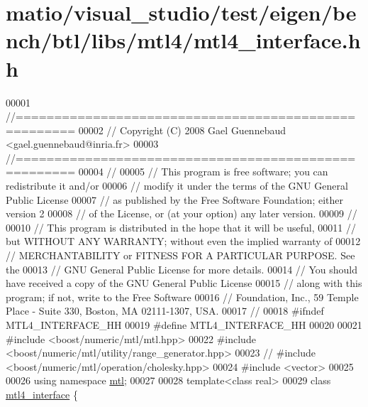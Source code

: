 \hypertarget{matio_2visual__studio_2test_2eigen_2bench_2btl_2libs_2mtl4_2mtl4__interface_8hh_source}{}\section{matio/visual\+\_\+studio/test/eigen/bench/btl/libs/mtl4/mtl4\+\_\+interface.hh}
\label{matio_2visual__studio_2test_2eigen_2bench_2btl_2libs_2mtl4_2mtl4__interface_8hh_source}

\begin{DoxyCode}
00001 \textcolor{comment}{//=====================================================}
00002 \textcolor{comment}{// Copyright (C) 2008 Gael Guennebaud <gael.guennebaud@inria.fr>}
00003 \textcolor{comment}{//=====================================================}
00004 \textcolor{comment}{//}
00005 \textcolor{comment}{// This program is free software; you can redistribute it and/or}
00006 \textcolor{comment}{// modify it under the terms of the GNU General Public License}
00007 \textcolor{comment}{// as published by the Free Software Foundation; either version 2}
00008 \textcolor{comment}{// of the License, or (at your option) any later version.}
00009 \textcolor{comment}{//}
00010 \textcolor{comment}{// This program is distributed in the hope that it will be useful,}
00011 \textcolor{comment}{// but WITHOUT ANY WARRANTY; without even the implied warranty of}
00012 \textcolor{comment}{// MERCHANTABILITY or FITNESS FOR A PARTICULAR PURPOSE.  See the}
00013 \textcolor{comment}{// GNU General Public License for more details.}
00014 \textcolor{comment}{// You should have received a copy of the GNU General Public License}
00015 \textcolor{comment}{// along with this program; if not, write to the Free Software}
00016 \textcolor{comment}{// Foundation, Inc., 59 Temple Place - Suite 330, Boston, MA  02111-1307, USA.}
00017 \textcolor{comment}{//}
00018 \textcolor{preprocessor}{#ifndef MTL4\_INTERFACE\_HH}
00019 \textcolor{preprocessor}{#define MTL4\_INTERFACE\_HH}
00020 
00021 \textcolor{preprocessor}{#include <boost/numeric/mtl/mtl.hpp>}
00022 \textcolor{preprocessor}{#include <boost/numeric/mtl/utility/range\_generator.hpp>}
00023 \textcolor{comment}{// #include <boost/numeric/mtl/operation/cholesky.hpp>}
00024 \textcolor{preprocessor}{#include <vector>}
00025 
00026 \textcolor{keyword}{using namespace }\hyperlink{namespacemtl}{mtl};
00027 
00028 \textcolor{keyword}{template}<\textcolor{keyword}{class} real>
00029 \textcolor{keyword}{class }\hyperlink{classmtl4__interface}{mtl4\_interface} \{

\end{DoxyCode}
